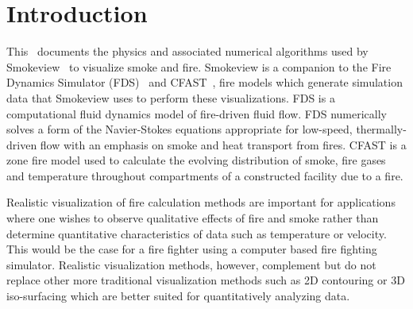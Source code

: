 


\section{Introduction}
This \paper\ documents the physics and associated numerical
algorithms used by Smokeview~\cite{Smokeview_Users_Guide} to
visualize smoke and fire.  Smokeview is a companion to the Fire
Dynamics Simulator (FDS)~\cite{FDS_Math_Guide} and
CFAST~\cite{Jones:2009}, fire models which generate   simulation
data that Smokeview uses to perform these visualizations. FDS is a
computational fluid dynamics model of fire-driven fluid flow. FDS
numerically solves a form of the Navier-Stokes equations
appropriate for low-speed, thermally-driven flow with an emphasis
on smoke and heat transport from fires.  CFAST is a zone fire
model used to calculate the evolving distribution of smoke, fire
gases and temperature throughout compartments of a constructed
facility due to a fire.

Realistic visualization of fire calculation methods are important
for applications where one wishes to observe qualitative effects
of fire and smoke rather than determine quantitative
characteristics of data such as temperature or velocity.  This
would be the case for a fire fighter using a computer based fire
fighting simulator. Realistic visualization methods, however,
complement but do not replace other more traditional visualization
methods such as 2D contouring or 3D iso-surfacing which are better
suited for quantitatively analyzing data.


